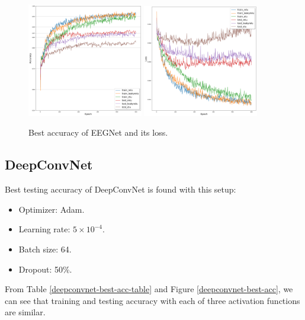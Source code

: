 	\begin{figure}[H]
		\centering
		\includegraphics[width=0.45\textwidth]{img/eegnet_adam_128_0.005_0.5_acc.png}
		\includegraphics[width=0.45\textwidth]{img/eegnet_adam_128_0.005_0.5_loss.png}
		\caption{Best accuracy of EEGNet and its loss.}
		\label{eegnet-best-acc}
	\end{figure}


\pagebreak
\subsection{DeepConvNet}
	Best testing accuracy of DeepConvNet is found with this setup: 
	\begin{itemize}
		\item Optimizer: Adam.
		\item Learning rate: $5 \times 10^{-4}$.
		\item Batch size: 64.
		\item Dropout: 50\%.
	\end{itemize} 
	From Table \ref{deepconvnet-best-acc-table} and Figure \ref{deepconvnet-best-acc}, 
	we can see that training and testing accuracy with each of three activation functions are similar.

